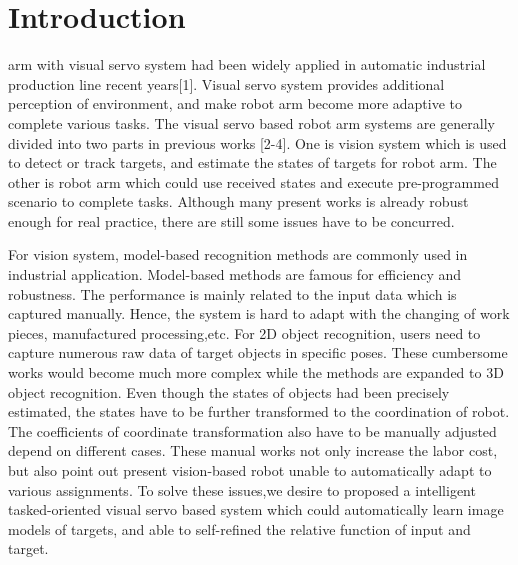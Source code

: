\documentclass[journal]{IEEEtran}
\begin{document}
%
\IEEEpeerreviewmaketitle



\section{Introduction}


% 
% 
% 
% 
 arm with visual servo system had been widely applied in automatic industrial production line recent years[1]. Visual servo system provides additional perception of environment, and make robot arm become more adaptive to complete various tasks. The visual servo based robot arm systems are generally divided into two parts in previous works [2-4]. One is vision system which is used to detect or track targets, and estimate the states of targets for robot arm. The other is robot arm which could use received states and execute pre-programmed scenario to complete tasks. Although many present works is already robust enough for real practice, there are still some issues have to be concurred. 

For vision system, model-based recognition methods are commonly used in industrial application. Model-based methods are famous for efficiency and robustness. The performance is mainly related to the input data which is captured manually. Hence, the system is hard to adapt with the changing of work pieces, manufactured processing,etc. For 2D object recognition, users need to capture numerous raw data of target objects in specific poses. These cumbersome works would become much more complex while the methods are expanded to 3D object recognition. Even though the states of objects had been precisely estimated, the states have to be further transformed to the coordination of robot. The coefficients of coordinate transformation also have to be manually adjusted depend on different cases. These manual works not only increase the labor cost, but also point out present vision-based robot unable to automatically adapt to various assignments. To solve these issues,we desire to proposed a intelligent tasked-oriented visual servo based system which could automatically learn image models of targets, and able to self-refined the relative function of input and target.
\end{document}
